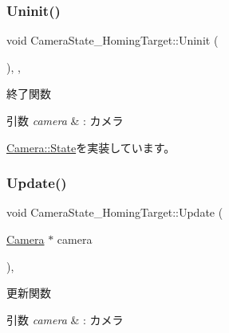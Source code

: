 \mbox{\label{class_camera_state___homing_target_ab2b5379b35ebafc53189bf4d45646c8c}} 
\subsubsection{\texorpdfstring{Uninit()}{Uninit()}}
{\footnotesize\ttfamily void Camera\+State\+\_\+\+Homing\+Target\+::\+Uninit (\begin{DoxyParamCaption}{ }\end{DoxyParamCaption})\hspace{0.3cm}{\ttfamily [inline]}, {\ttfamily [override]}, {\ttfamily [virtual]}}



終了関数 


\begin{DoxyParams}{引数}
{\em camera} & \+: カメラ \\
\hline
\end{DoxyParams}


\mbox{\hyperlink{class_camera_1_1_state_adb3f43b6c3f8100da7877867180e804b}{Camera\+::\+State}}を実装しています。

\mbox{\label{class_camera_state___homing_target_a98f04985c06033febdad32d6357088c9}} 
\subsubsection{\texorpdfstring{Update()}{Update()}}
{\footnotesize\ttfamily void Camera\+State\+\_\+\+Homing\+Target\+::\+Update (\begin{DoxyParamCaption}\item[{\mbox{\hyperlink{class_camera}{Camera}} $\ast$}]{camera }\end{DoxyParamCaption})\hspace{0.3cm}{\ttfamily [override]}, {\ttfamily [virtual]}}



更新関数 


\begin{DoxyParams}{引数}
{\em camera} & \+: カメラ \\
\hline
\end{DoxyParams}



